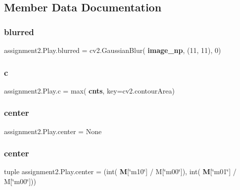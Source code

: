 \subsection{Member Data Documentation}
\mbox{\label{classassignment2_1_1_play_a5b384ada843955b54d3b2d3fcdb7c74b}} 
\subsubsection{blurred}
{\footnotesize\ttfamily assignment2.\+Play.\+blurred = cv2.\+Gaussian\+Blur(\textbf{ image\+\_\+np}, (11, 11), 0)\hspace{0.3cm}{\ttfamily [static]}}

\mbox{\label{classassignment2_1_1_play_ac8f4bf62f790f27a244f0ca99ec56429}} 
\subsubsection{c}
{\footnotesize\ttfamily assignment2.\+Play.\+c = max(\textbf{ cnts}, key=cv2.\+contour\+Area)\hspace{0.3cm}{\ttfamily [static]}}

\mbox{\label{classassignment2_1_1_play_a39f48ccb7a14fff7faf92905b93e568f}} 
\subsubsection{center\hspace{0.1cm}{\footnotesize\ttfamily [1/2]}}
{\footnotesize\ttfamily assignment2.\+Play.\+center = None\hspace{0.3cm}{\ttfamily [static]}}

\mbox{\label{classassignment2_1_1_play_add9ac840a66c637dd9006f28f1e1ecdd}} 
\subsubsection{center\hspace{0.1cm}{\footnotesize\ttfamily [2/2]}}
{\footnotesize\ttfamily tuple assignment2.\+Play.\+center = (int(\textbf{ M}[\char`\"{}m10\char`\"{}] / M[\char`\"{}m00\char`\"{}]), int(\textbf{ M}[\char`\"{}m01\char`\"{}] / M[\char`\"{}m00\char`\"{}]))\hspace{0.3cm}{\ttfamily [static]}}

